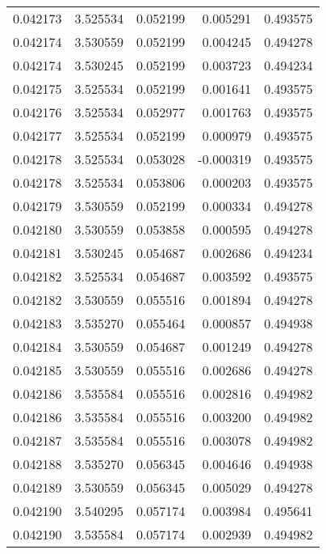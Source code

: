 \begin{tabular}{lrrrr}
0.042173    &  3.525534 &  0.052199 &  0.005291 &             0.493575 \\
0.042174    &  3.530559 &  0.052199 &  0.004245 &             0.494278 \\
0.042174    &  3.530245 &  0.052199 &  0.003723 &             0.494234 \\
0.042175    &  3.525534 &  0.052199 &  0.001641 &             0.493575 \\
0.042176    &  3.525534 &  0.052977 &  0.001763 &             0.493575 \\
0.042177    &  3.525534 &  0.052199 &  0.000979 &             0.493575 \\
0.042178    &  3.525534 &  0.053028 & -0.000319 &             0.493575 \\
0.042178    &  3.525534 &  0.053806 &  0.000203 &             0.493575 \\
0.042179    &  3.530559 &  0.052199 &  0.000334 &             0.494278 \\
0.042180    &  3.530559 &  0.053858 &  0.000595 &             0.494278 \\
0.042181    &  3.530245 &  0.054687 &  0.002686 &             0.494234 \\
0.042182    &  3.525534 &  0.054687 &  0.003592 &             0.493575 \\
0.042182    &  3.530559 &  0.055516 &  0.001894 &             0.494278 \\
0.042183    &  3.535270 &  0.055464 &  0.000857 &             0.494938 \\
0.042184    &  3.530559 &  0.054687 &  0.001249 &             0.494278 \\
0.042185    &  3.530559 &  0.055516 &  0.002686 &             0.494278 \\
0.042186    &  3.535584 &  0.055516 &  0.002816 &             0.494982 \\
0.042186    &  3.535584 &  0.055516 &  0.003200 &             0.494982 \\
0.042187    &  3.535584 &  0.055516 &  0.003078 &             0.494982 \\
0.042188    &  3.535270 &  0.056345 &  0.004646 &             0.494938 \\
0.042189    &  3.530559 &  0.056345 &  0.005029 &             0.494278 \\
0.042190    &  3.540295 &  0.057174 &  0.003984 &             0.495641 \\
0.042190    &  3.535584 &  0.057174 &  0.002939 &             0.494982 \\

\end{tabular}
